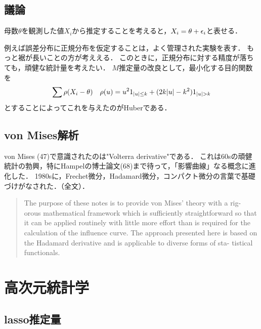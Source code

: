 \documentclass[uplatex,dvipdfmx]{jsreport}
\begin{document}
\section{議論}

母数$\theta$を観測した値$X_i$から推定することを考えると，$X_i=\theta+\epsilon_i$と表せる．


例えば誤差分布に正規分布を仮定することは，よく管理された実験を表す．
もっと裾が長いことの方が考ええる．
このときに，正規分布に対する精度が落ちても，頑健な統計量を考えたい．
$M$推定量の改良として，最小化する目的関数を
\[\sum\rho(X_i-\theta)\quad\rho(u)=u^21_{\lvert u\rvert\le k}+(2k\lvert u\rvert-k^2)1_{\lvert u\rvert>k}\]
とすることによってこれを与えたのがHuberである．

\section{von Mises解析}

\begin{history}
    von Mises (47)で意識されたのは"Volterra derivative"である．
    これは60sの頑健統計の勃興，特にHampelの博士論文(68)まで待って，「影響曲線」なる概念に進化した．
    1980sに，Frechet微分，Hadamard微分，コンパクト微分の言葉で基礎づけがなされた．（\cite{von Mises calculus}全文）．
    \begin{quote}
        The purpose of these notes is to provide von Mises' theory with a rig-
orous mathematical framework which is sufficiently straightforward so that it can be applied routinely with little more effort than is required for the calculation of the influence curve. The approach presented here is based on the Hadamard derivative and is applicable to diverse forms of sta- tistical functionals.\cite{von Mises calculus}
    \end{quote}
\end{history}

\chapter{高次元統計学}

\section{lasso推定量}

\begin{definition}
    
\end{definition}
\end{document}
